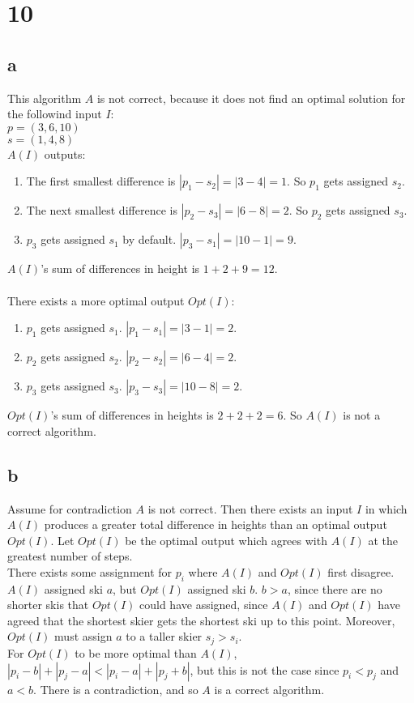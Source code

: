 \documentclass[letterpaper,notitlepage,twoside]{article}
\begin{document}
\section*{10}
\subsection*{a}
This algorithm $A$ is not correct, because it does not find an optimal solution for the followind input $I$:\\
$p = (3, 6, 10)$\\
$s = (1, 4, 8)$\\
$A(I)$ outputs:
\begin{enumerate}
\item The first smallest difference is $|p_1 - s_2| = |3 - 4| = 1$. So $p_1$ gets assigned $s_2$.
\item The next smallest difference is $|p_2 - s_3| = |6 - 8| = 2$. So $p_2$ gets assigned $s_3$.
\item $p_3$ gets assigned $s_1$ by default. $|p_3 - s_1| = |10 - 1| = 9$.
\end{enumerate}
$A(I)$'s sum of differences in height is $1 + 2 + 9 = 12$.\\\\

There exists a more optimal output $Opt(I)$:
\begin{enumerate}
\item $p_1$ gets assigned $s_1$. $|p_1 - s_1| = |3 - 1| = 2$.
\item $p_2$ gets assigned $s_2$. $|p_2 - s_2| = |6 - 4| = 2$.
\item $p_3$ gets assigned $s_3$. $|p_3 - s_3| = |10 - 8| = 2$.
\end{enumerate}
$Opt(I)$'s sum of differences in heights is $2 + 2 + 2 = 6$. So $A(I)$ is not a correct algorithm.

\subsection*{b}
Assume for contradiction $A$ is not correct. Then there exists an input $I$ in which $A(I)$ produces a greater total difference in heights than an optimal output $Opt(I)$. Let $Opt(I)$ be the optimal output which agrees with $A(I)$ at the greatest number of steps.\\

There exists some assignment for $p_i$ where $A(I)$ and $Opt(I)$ first disagree. $A(I)$ assigned ski $a$, but $Opt(I)$ assigned ski $b$. $b > a$, since there are no shorter skis that $Opt(I)$ could have assigned, since $A(I)$ and $Opt(I)$ have agreed that the shortest skier gets the shortest ski up to this point. Moreover, $Opt(I)$ must assign $a$ to a taller skier $s_j > s_i$.\\

For $Opt(I)$ to be more optimal than $A(I)$, $|p_i - b| + |p_j - a| < |p_i - a| + |p_j + b|$, but this is not the case since $p_i < p_j$ and $a < b$. There is a contradiction, and so $A$ is a correct algorithm.
\end{document}
